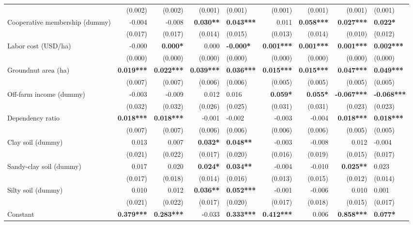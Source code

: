 \documentclass[
]{article}
\begin{document}
\begin{landscape}
\begin{longtable}[t]{lrrrlrrrl}
 & (0.002) & (0.002) & (0.001) & (0.001) & (0.001) & (0.001) & (0.001) & (0.001)\\
Cooperative membership (dummy) & -0.004 & -0.008 & \textbf{0.030**} & \textbf{0.043***} & 0.011 & \textbf{0.058***} & \textbf{0.027***} & \textbf{0.022*}\\
 & (0.017) & (0.017) & (0.014) & (0.015) & (0.013) & (0.014) & (0.010) & (0.012)\\
Labor cost (USD/ha) & -0.000 & \textbf{0.000*} & 0.000 & \textbf{-0.000*} & \textbf{0.001***} & \textbf{0.001***} & \textbf{0.001***} & \textbf{0.002***}\\
 & (0.000) & (0.000) & (0.000) & (0.000) & (0.000) & (0.000) & (0.000) & (0.000)\\
\addlinespace
Groundnut area (ha) & \textbf{0.019***} & \textbf{0.022***} & \textbf{0.039***} & \textbf{0.036***} & \textbf{0.015***} & \textbf{0.015***} & \textbf{0.047***} & \textbf{0.049***}\\
 & (0.007) & (0.007) & (0.006) & (0.006) & (0.005) & (0.005) & (0.005) & (0.005)\\
Off-farm income (dummy) & -0.003 & -0.009 & 0.012 & 0.016 & \textbf{0.059*} & \textbf{0.055*} & \textbf{-0.067***} & \textbf{-0.068***}\\
 & (0.032) & (0.032) & (0.026) & (0.025) & (0.031) & (0.031) & (0.023) & (0.023)\\
Dependency ratio & \textbf{0.018***} & \textbf{0.018***} & -0.001 & -0.002 & -0.003 & -0.004 & \textbf{0.018***} & \textbf{0.018***}\\
\addlinespace
 & (0.007) & (0.007) & (0.006) & (0.006) & (0.006) & (0.006) & (0.005) & (0.005)\\
Clay soil (dummy) & 0.013 & 0.007 & \textbf{0.032*} & \textbf{0.048**} & -0.003 & -0.008 & 0.012 & -0.004\\
 & (0.021) & (0.022) & (0.017) & (0.020) & (0.016) & (0.019) & (0.015) & (0.017)\\
Sandy-clay soil (dummy) & 0.017 & 0.020 & \textbf{0.024*} & \textbf{0.034**} & -0.004 & -0.010 & \textbf{0.025**} & 0.023\\
 & (0.017) & (0.018) & (0.014) & (0.016) & (0.013) & (0.015) & (0.012) & (0.014)\\
\addlinespace
Silty soil (dummy) & 0.010 & 0.012 & \textbf{0.036**} & \textbf{0.052***} & -0.001 & -0.006 & 0.010 & 0.001\\
 & (0.021) & (0.022) & (0.017) & (0.020) & (0.017) & (0.018) & (0.015) & (0.017)\\
Constant & \textbf{0.379***} & \textbf{0.283***} & -0.033 & \textbf{0.333***} & \textbf{0.412***} & 0.006 & \textbf{0.858***} & \textbf{0.077*}\\

\end{longtable}
\end{landscape}
\end{document}
